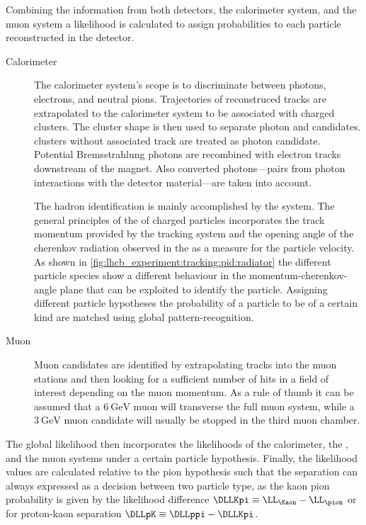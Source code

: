 Combining the information from both \RICH detectors, the calorimeter system, and
the muon system a likelihood is calculated to assign \PID probabilities to each
particle reconstructed in the detector.
%
\begin{description}
  \item[Calorimeter \PID] The calorimeter system's scope is to discriminate
  between photons, electrons, and neutral pions. Trajectories of reconstruced
  tracks are extrapolated to the calorimeter system to be associated with
  charged clusters. The cluster shape is then used to separate photon and \piz
  candidates. \ECAL clusters without associated track are treated as photon
  candidate. Potential Bremsstrahlung photons are recombined with electron
  tracks downstream of the magnet. Also converted photons---\elel pairs from
  photon interactions with the detector material---are taken into account.
  \item[\RICH \PID] The hadron identification is mainly accomplished by the
  \RICH system. The general principles of the \RICH \PID of charged particles
  incorporates the track momentum provided by the tracking system and the
  opening angle of the cherenkov radiation observed in the \RICH as a measure
  for the particle velocity. As shown in
  \cref{fig:lhcb_experiment:tracking:pid:radiator} the different particle
  species show a different behaviour in the momentum-cherenkov-angle plane that
  can be exploited to identify the particle. Assigning different particle
  hypotheses the probability of a particle to be of a certain kind are matched
  using global pattern-recognition.
  \item[Muon \PID] Muon candidates are identified by extrapolating tracks into
  the muon stations and then looking for a sufficient number of hits in a field
  of interest depending on the muon momentum. As a rule of thumb it can be
  assumed that a $\SI{6}{\GeV}$ muon will transverse the full muon system, while
  a $\SI{3}{\GeV}$ muon candidate will usually be stopped in the third muon
  chamber.
\end{description}
%
The global \PID likelihood then incorporates the likelihoods of the calorimeter,
the \RICH, and the muon systems under a certain particle hypothesis. Finally,
the likelihood values are calculated relative to the pion hypothesis such that
the separation can always expressed as a decision between two particle type, as
\eg the kaon \vs pion probability is given by the likelihood difference $\DLLKpi
\equiv \LL_{\Kaon} - \LL_{\pion}$ or for proton-kaon separation $\DLLpK \equiv
\DLLppi - \DLLKpi$.

